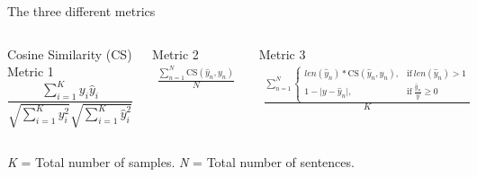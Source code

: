 \documentclass[10pt]{beamer}
\begin{document}
\begin{frame}[fragile]{The three different metrics}

\begin{columns}[T,onlytextwidth]

\begin{block}{Cosine Similarity (CS) Metric 1}
\begin{equation}
\frac{ \sum\limits_{i=1}^{K}{y_i  \hat y_i} }{ \sqrt{\sum\limits_{i=1}^{K}{y_i^2}}  \sqrt{\sum\limits_{i=1}^{K}{\hat y_i^2}} }
\end{equation}
\end{block}

\begin{block}{Metric 2}
\begin{equation}
\label{eq:first_eval}
\begin{gathered}
\frac{\sum_{n=1}^{N} \text{CS}(\hat y_n, y_n)}{N}
\end{gathered}
\end{equation}
\end{block}

\begin{block}{Metric 3}
\begin{equation}
\begin{gathered}
\frac{\sum_{n=1}^{N} \begin{cases}len(\hat y_n) * \text{CS}(\hat y_n, y_n), & \text{if}\ len(\hat y_n) > 1 \\
      1 - \lvert y - \hat y_n \rvert, & \text{if}\ \frac{\hat y_n}{y}\geq0
      \end{cases} }{K}
\end{gathered}
\end{equation}

\end{block}

\end{columns}
\textit{K} = Total number of samples. \newline
\textit{N} = Total number of sentences.


\end{frame}
\end{document}
